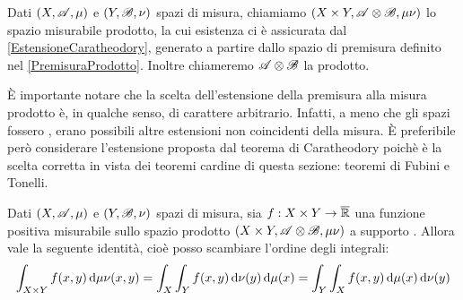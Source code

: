 \begin{definition}
	Dati $(X,\mathscr A,\mu)$ e $(Y,\mathscr B,\nu)$ spazi di misura, chiamiamo $(X\times Y,\mathscr A\otimes\mathscr B,\mu\nu)$ lo spazio misurabile prodotto, la cui esistenza ci è assicurata dal \cref{EstensioneCaratheodory}, generato a partire dallo spazio di premisura definito nel \cref{PremisuraProdotto}. Inoltre chiameremo $\mathscr A\otimes\mathscr B$ la \sigalg{} prodotto.
\end{definition}

È importante notare che la scelta dell'estensione della premisura alla misura prodotto è, in qualche senso, di carattere arbitrario. Infatti, a meno che gli spazi fossero \sigfin[i], erano possibili altre estensioni non coincidenti della misura. 
È preferibile però considerare l'estensione proposta dal teorema di Caratheodory poichè è la scelta corretta in vista dei teoremi cardine di questa sezione: teoremi di Fubini e Tonelli.

\begin{theorem}[Tonelli]
	Dati $(X,\mathscr A,\mu)$ e $(Y,\mathscr B,\nu)$ spazi di misura, sia $f:X\times Y\to \overline{\mathbb R}$ una funzione positiva misurabile sullo spazio prodotto $(X\times Y,\mathscr A\otimes\mathscr B,\mu\nu)$ a supporto \sigfin[o].
	Allora vale la seguente identità, cioè posso scambiare l'ordine degli integrali:
	\begin{equation*}
		\int_{X\times Y}f(x,y)\,\mathrm d\mu\nu(x,y)=\int_X\int_Y f(x,y)\,\mathrm d\nu(y)\,\mathrm d\mu(x)=\int_Y\int_Xf(x,y)\,\mathrm d\mu(x)\,\mathrm d\nu(y)
	\end{equation*}

\end{theorem}
